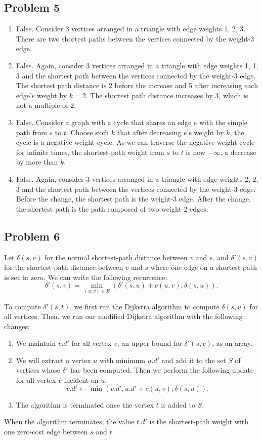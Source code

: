 \documentclass{article}
\begin{document}
\subsection*{Problem 5}

\begin{enumerate}
    \item False. Consider 3 vertices arranged in a triangle with edge weights 1, 2, 3. There are two shortest paths between the vertices connected by the weight-3 edge.
    \item False. Again, consider 3 vertices arranged in a triangle with edge weights 1, 1, 3 and the shortest path between the vertices connected by the weight-3 edge. The shortest path distance is 2 before the increase and 5 after increasing each edge's weight by $k = 2$. The shortest path distance increases by 3, which is not a multiple of 2.
    \item False. Consider a graph with a cycle that shares an edge $e$ with the simple path from $s$ to $t$. Choose such $k$ that after decreasing $e$'s weight by $k$, the cycle is a negative-weight cycle. As we can traverse the negative-weight cycle for infinite times, the shortest-path weight from $s$ to $t$ is now $-\infty$, a decrease by more than $k$.
    \item False. Again, consider 3 vertices arranged in a triangle with edge weights 2, 2, 3 and the shortest path between the vertices connected by the weight-3 edge. Before the change, the shortest path is the weight-3 edge. After the change, the shortest path is the path composed of two weight-2 edges.
\end{enumerate}

\subsection*{Problem 6}

Let $\delta(s, v)$ for the normal shortest-path distance between $v$ and $s$, and $\delta'(s, v)$ for the shortest-path distance between $v$ and $s$ where one edge on a shortest path is set to zero. We can write the following recurrence:
\[
    \delta'(s, v) = \min_{(u, v) \in E}(\delta'(s, u) + c(u, v), \delta(s, u)).
\]

To compute $\delta'(s, t)$, we first run the Dijkstra algorithm to compute $\delta(s, v)$ for all vertices. Then, we run our modified Dijkstra algorithm with the following changes:
\begin{enumerate}
    \item We maintain $v.d'$ for all vertex $v$, an upper bound for $\delta'(s, v)$, as an array.
    \item We will extract a vertex $u$ with minimum $u.d'$ and add it to the set $S$ of vertices whose $\delta'$ has been computed. Then we perform the following update for all vertex $v$ incident on $u$:
    \[
        v.d' \gets \min(v.d', u.d' + c(u, v), \delta(s, u)).
    \]
    \item The algorithm is terminated once the vertex $t$ is added to $S$.
\end{enumerate}

When the algorithm terminates, the value $t.d'$ is the shortest-path weight with one zero-cost edge between $s$ and $t$.
\end{document}
